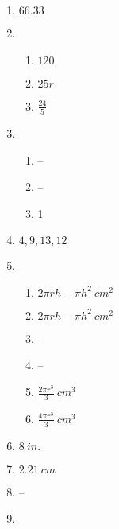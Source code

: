 \documentclass{article}
\begin{document}
\begin{enumerate}
\item $66.33$

\item 

	\begin{enumerate}
	
	\item $120$
	
	\item $25r$
	
	\item $\frac{24}{5}$
	
	\end{enumerate}
	
\item

	\begin{enumerate}
	
	\item --
	
	\item --
	
	\item 1
	
	\end{enumerate}
	
\item $4, 9, 13, 12$

\item

	\begin{enumerate}
	
	\item $2 \pi r h - \pi h^2 \ cm^2$
	
	\item $2 \pi r h - \pi h^2 \ cm^2$
	
	\item --
	
	\item --
	
	\item $\frac{2 \pi r^3}{3} \ cm^3 $
	
	\item $\frac{4 \pi r^3}{3} \ cm^3$
	
	\end{enumerate}
	
\item $8 \ in.$

\item $2.21 \ cm$

\item --

\item 


\end{enumerate}
\end{document}
